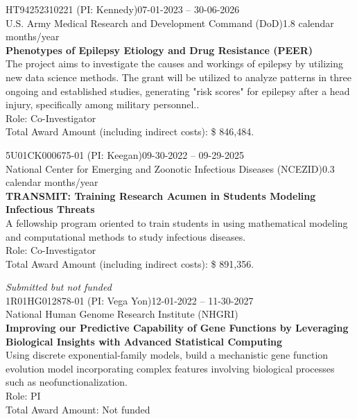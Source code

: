 \documentclass[letterpaper, 10pt]{article}
\renewcommand{\textbf}[1]{{\bfseries\color{teal}#1}}
\begin{document}
\noindent HT94252310221 (PI: Kennedy)\hfill 07-01-2023 -- 30-06-2026\\
U.S. Army Medical Research and Development Command (DoD)\hfill 1.8 calendar months/year\\
\textbf{Phenotypes of Epilepsy Etiology and Drug Resistance (PEER)}\\
The project aims to investigate the causes and workings of epilepsy by utilizing new data science methods. The grant will be utilized to analyze patterns in three ongoing and established studies, generating "risk scores" for epilepsy after a head injury, specifically among military personnel..\\
Role: Co-Investigator\\
Total Award Amount (including indirect costs): \$ 846,484. \vspace{.5cm}

\noindent 5U01CK000675-01 (PI: Keegan)\hfill 09-30-2022 -- 09-29-2025\\
National Center for Emerging and Zoonotic Infectious Diseases (NCEZID)\hfill 0.3 calendar months/year\\
\textbf{TRANSMIT: Training Research Acumen in Students Modeling Infectious Threats}\\
A fellowship program oriented to train students in using mathematical modeling and computational methods to study infectious diseases.\\
Role: Co-Investigator\\
Total Award Amount (including indirect costs): \$ 891,356. \vspace{.5cm}

\noindent \textit{Submitted but not funded}\\

\noindent 1R01HG012878-01 (PI: Vega Yon)\hfill 12-01-2022 -- 11-30-2027\\
National Human Genome Research Institute (NHGRI)\\
\textbf{Improving our Predictive Capability of Gene Functions by Leveraging Biological Insights with Advanced Statistical Computing}\\
Using discrete exponential-family models, build a mechanistic gene function evolution model incorporating complex features involving biological processes such as neofunctionalization.\\
Role: PI\\
Total Award Amount: Not funded \vspace{.5cm}
\end{document}

